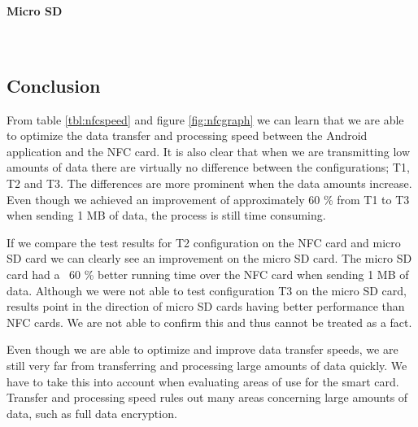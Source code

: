 \newpage
\paragraph{Micro SD}\mbox{}\\


\newpage
\subsection{Conclusion}
From table \ref{tbl:nfcspeed} and figure \ref{fig:nfcgraph} we can learn that we are able to optimize the data transfer and processing speed between the Android application and the NFC card. It is also clear that when we are transmitting low amounts of data there are virtually no difference between the configurations; T1, T2 and T3. The differences are more prominent when the data amounts increase. Even though we achieved an improvement of approximately 60 \% from T1 to T3 when sending 1 MB of data, the process is still time consuming.

If we compare the test results for T2 configuration on the NFC card and micro SD card we can clearly see an improvement on the micro SD card. The micro SD card had a ~60 \%  better running time over the NFC card when sending 1 MB of data. Although we were not able to test configuration T3 on the micro SD card, results point in the direction of micro SD cards having better performance than NFC cards. We are not able to confirm this and thus cannot be treated as a fact.

Even though we are able to optimize and improve data transfer speeds, we are still very far from transferring and processing large amounts of data quickly. We have to take this into account when evaluating areas of use for the smart card. Transfer and processing speed rules out many areas concerning large amounts of data, such as full data encryption.
